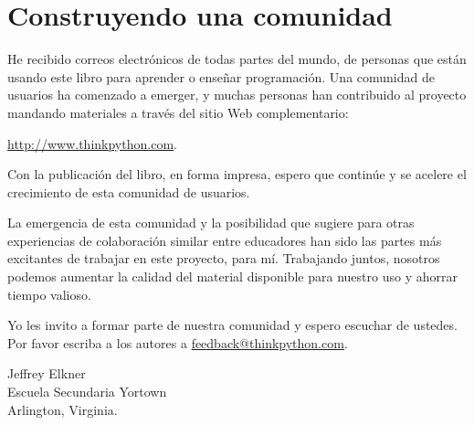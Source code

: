 \section*{Construyendo una comunidad}

He recibido correos electrónicos de todas partes del mundo, de personas que
están usando este libro 
para aprender o enseñar programación.  Una comunidad de usuarios ha comenzado a 
emerger, y muchas personas han contribuido al proyecto mandando materiales a
través del sitio Web complementario: 

  \url{http://www.thinkpython.com}.  

\medskip

Con la publicación del libro, en forma impresa, espero que continúe y se 
acelere el crecimiento de esta comunidad de usuarios.  

La emergencia de esta comunidad y la posibilidad que sugiere para otras
experiencias de colaboración similar entre educadores han sido las partes más 
excitantes de trabajar en este proyecto, para mí.  Trabajando juntos, nosotros 
podemos aumentar la calidad del material disponible para nuestro uso y ahorrar 
tiempo valioso.  

Yo les invito a formar parte de nuestra comunidad y espero escuchar de ustedes.  
Por favor escriba a los autores a 
\href{mailto:feedback@thinkpython.com}{feedback@thinkpython.com}.

\vspace{0.25in}
\begin{flushleft}
Jeffrey Elkner\\
Escuela Secundaria Yortown\\
Arlington, Virginia.\\
\end{flushleft}
